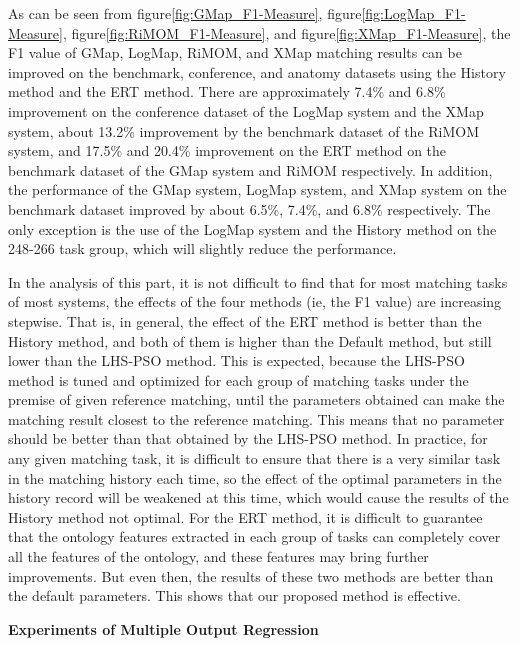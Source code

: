 \documentclass[twoside]{article}
\begin{document}
As can be seen from figure\ref{fig:GMap_F1-Measure}, figure\ref{fig:LogMap_F1-Measure}, figure\ref{fig:RiMOM_F1-Measure}, and figure\ref{fig:XMap_F1-Measure}, the F1 value of GMap, LogMap, RiMOM, and XMap matching results can be improved on the benchmark, conference, and anatomy datasets using the History method and the ERT method. There are  approximately 7.4\% and 6.8\% improvement on the conference dataset of the LogMap system and the XMap system, about 13.2\% improvement by the benchmark dataset of the RiMOM system, and 17.5\% and 20.4\% improvement on the ERT method on the benchmark dataset of the GMap system and RiMOM respectively. In addition, the performance of the GMap system, LogMap system, and XMap system on the benchmark dataset improved by about 6.5\%, 7.4\%, and 6.8\% respectively.
The only exception is the use of the LogMap system and the History method on the 248-266 task group, which will slightly reduce the performance.

In the analysis of this part, it is not difficult to find that for most matching tasks of most systems, the effects of the four methods (ie, the F1 value) are increasing stepwise.
That is, in general, the effect of the ERT method is better than the History method, and both of them is higher than the Default method, but still lower than the LHS-PSO method.
This is expected, because the LHS-PSO method is tuned and optimized for each group of matching tasks under the premise of given reference matching, until the parameters obtained can make the matching result closest to the reference matching.
This means that no parameter should be better than that obtained by the LHS-PSO method.
In practice, for any given matching task, it is difficult to ensure that there is a very similar task in the matching history each time, so the effect of the optimal parameters in the history record will be weakened at this time, which would cause the results of the History method not optimal.
For the ERT method, it is difficult to guarantee that the ontology features extracted in each group of tasks can completely cover all the features of the ontology, and these features may bring further improvements.
But even then, the results of these two methods are better than the default parameters.
This shows that our proposed method is effective.

{\bf Experiments of Multiple Output Regression}

%
\end{document}
